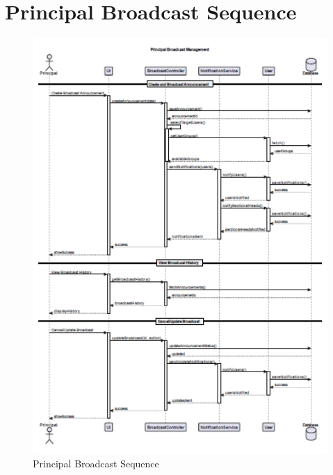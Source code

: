 \documentclass[12pt,a4paper]{report}
\begin{document}
\section{Principal Broadcast Sequence}
\begin{figure}[htbp]
    \centering
    \includegraphics[width=1\textwidth]{principal-broadcast-sequence.png}
    \caption{Principal Broadcast Sequence}
    \label{fig:principal-broadcast-sequence}
\end{figure}
\end{document}
